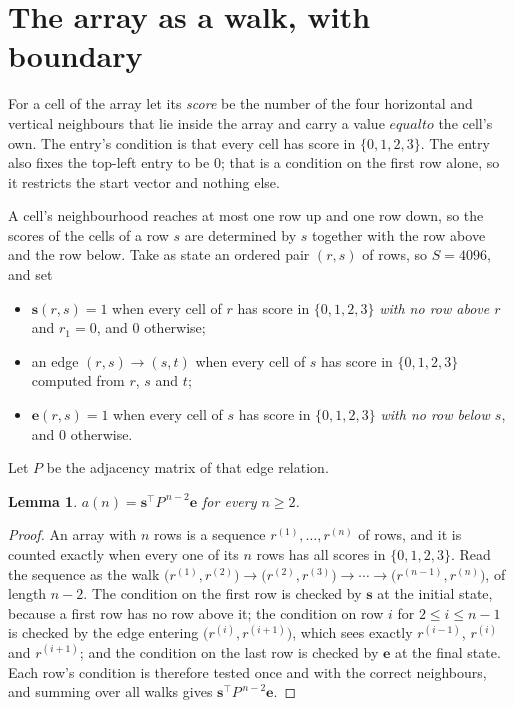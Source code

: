 \documentclass[11pt,a4paper]{article}
\theoremstyle{plain}
\newtheorem{lemma}[theorem]{Lemma}
\theoremstyle{definition}
\begin{document}
\section{The array as a walk, with boundary}

For a cell of the array let its \emph{score} be the number of the four horizontal and vertical neighbours that lie inside
the array and carry a value $equal to$ the cell's own. The entry's condition is that every cell
has score in $\{0,1,2,3\}$. The entry also fixes the top-left entry to be $0$; that is a condition on the first row alone, so it restricts the start vector and nothing else.

A cell's neighbourhood reaches at most one row up and one row down, so the scores of the
cells of a row $s$ are determined by $s$ together with the row above and the row below.
Take as state an ordered pair $(r,s)$ of rows, so $S=4096$, and set
\begin{itemize}
\item $\mathbf{s}(r,s)=1$ when every cell of $r$ has score in $\{0,1,2,3\}$ \emph{with no row
above $r$} and $r_1=0$, and $0$ otherwise;
\item an edge $(r,s)\to(s,t)$ when every cell of $s$ has score in $\{0,1,2,3\}$ computed from
$r$, $s$ and $t$;
\item $\mathbf{e}(r,s)=1$ when every cell of $s$ has score in $\{0,1,2,3\}$ \emph{with no row
below $s$}, and $0$ otherwise.
\end{itemize}
Let $P$ be the adjacency matrix of that edge relation.

\begin{lemma}\label{lem:walk}
$a(n)=\mathbf{s}^{\!\top}P^{\,n-2}\mathbf{e}$ for every $n\ge2$.
\end{lemma}

\begin{proof}
An array with $n$ rows is a sequence $r^{(1)},\dots,r^{(n)}$ of rows, and it is counted
exactly when every one of its $n$ rows has all scores in $\{0,1,2,3\}$. Read the sequence as the
walk $\bigl(r^{(1)},r^{(2)}\bigr)\to\bigl(r^{(2)},r^{(3)}\bigr)\to\cdots\to
\bigl(r^{(n-1)},r^{(n)}\bigr)$, of length $n-2$. The condition on the first row is
checked by $\mathbf{s}$ at the initial state, because a first row has no row above it; the
condition on row $i$ for $2\le i\le n-1$ is checked by the edge entering
$\bigl(r^{(i)},r^{(i+1)}\bigr)$, which sees exactly $r^{(i-1)}$, $r^{(i)}$ and
$r^{(i+1)}$; and the condition on the last row is checked by $\mathbf{e}$ at the final
state. Each row's condition is therefore tested once and with the correct neighbours, and
summing over all walks gives $\mathbf{s}^{\!\top}P^{\,n-2}\mathbf{e}$.
\end{proof}
\end{document}
